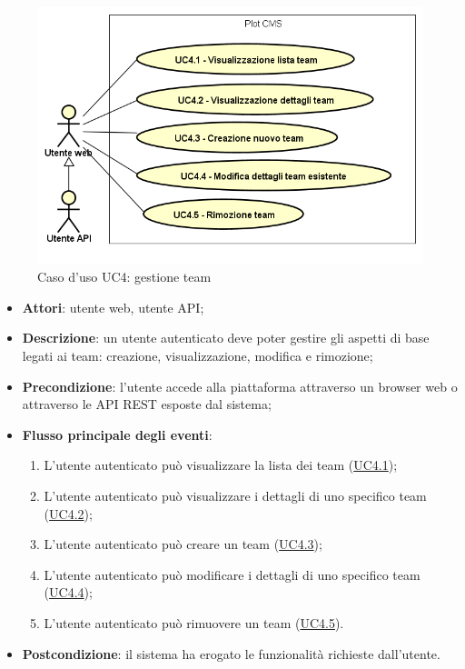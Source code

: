         \begin{figure}[H]
            \centering
            \includegraphics[scale=0.95, width=\textwidth]{immagini/usecase/UC4.png}
            \caption{Caso d'uso UC4: gestione team}\label{fig:UC4} 
        \end{figure}
\begin{itemize}
\item \textbf{Attori}: utente web, utente API;
\item \textbf{Descrizione}: un utente autenticato deve poter gestire gli aspetti di base legati ai team: creazione, visualizzazione, modifica e rimozione; 
      \item \textbf{Precondizione}: l'utente accede alla piattaforma attraverso un browser web o attraverso le API REST esposte dal sistema;

        \item \textbf{Flusso principale degli eventi}:
          \begin{enumerate}
          \item L'utente autenticato può visualizzare la lista dei team (\hyperlink{UC4.1}{UC4.1});
          \item L'utente autenticato può visualizzare i dettagli di uno specifico team (\hyperlink{UC4.2}{UC4.2});
          \item L'utente autenticato può creare un team (\hyperlink{UC4.3}{UC4.3});
          \item L'utente autenticato può modificare i dettagli di uno specifico team (\hyperlink{UC4.4}{UC4.4});
          \item L'utente autenticato può rimuovere un team (\hyperlink{UC4.5}{UC4.5}).

      \end{enumerate}
    \item \textbf{Postcondizione}: il sistema ha erogato le funzionalità richieste dall'utente.
  \end{itemize}
\hypertarget{UC4.1}{}

